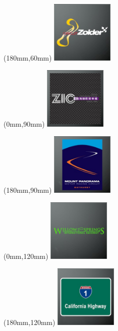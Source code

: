 \begin{textblock*}{30mm}(180mm,60mm)%
\includegraphics[width=30mm]{LG/2015-05-20_00100.png}
\end{textblock*}
\begin{textblock*}{30mm}(0mm,90mm)%
\includegraphics[width=30mm]{LG/2015-05-20_00099.png}
\end{textblock*}
\begin{textblock*}{30mm}(180mm,90mm)%
\includegraphics[width=30mm]{LG/2015-05-20_00087.png}
\end{textblock*}
\begin{textblock*}{30mm}(0mm,120mm)%
\includegraphics[width=30mm]{LG/2015-05-20_00098.png}
\end{textblock*}
\begin{textblock*}{30mm}(180mm,120mm)%
\includegraphics[width=30mm]{LG/2015-05-20_00077.png}
\end{textblock*}
